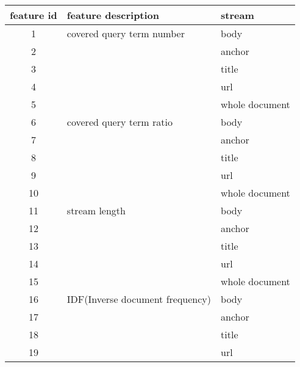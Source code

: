 
\begin{longtable}{cll}
\toprule feature id & feature description                                 & stream         \\
\midrule1          & covered query term number                           & body           \\
2          &                                                     & anchor         \\
3          &                                                     & title          \\
4          &                                                     & url            \\
5          &                                                     & whole document \\
\midrule6          & covered query term ratio                            & body           \\
7          &                                                     & anchor         \\
8          &                                                     & title          \\
9          &                                                     & url            \\
10         &                                                     & whole document \\
\midrule11         & stream length                                       & body           \\
12         &                                                     & anchor         \\
13         &                                                     & title          \\
14         &                                                     & url            \\
15         &                                                     & whole document \\
\midrule16         & IDF(Inverse document frequency)                     & body           \\
17         &                                                     & anchor         \\
18         &                                                     & title          \\
19         &                                                     & url            \\

\end{longtable}
